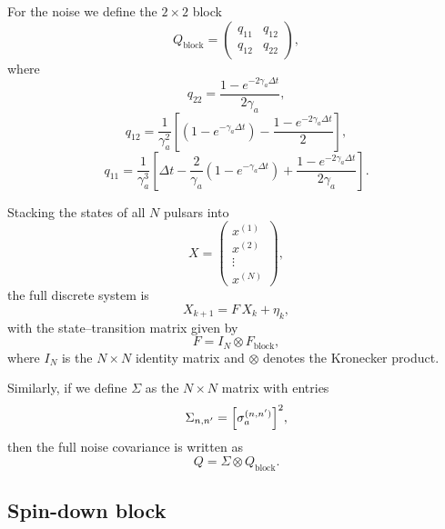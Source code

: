 \documentclass{tufte-handout} %
\begin{document}
For the noise we define the $2\times2$ block
\begin{equation}
Q_{\text{block}} = \begin{pmatrix}
q_{11} & q_{12}\\[1mm]
q_{12} & q_{22}
\end{pmatrix},
\end{equation}
where
\begin{equation}
q_{22} = \frac{1-e^{-2\gamma_a\Delta t}}{2\gamma_a},
\end{equation}
\begin{equation}
q_{12} = \frac{1}{\gamma_a^2}\left[\left(1-e^{-\gamma_a\Delta t}\right)-\frac{1-e^{-2\gamma_a\Delta t}}{2}\right],
\end{equation}
\begin{equation}
q_{11} = \frac{1}{\gamma_a^3}\left[\Delta t-\frac{2}{\gamma_a}\left(1-e^{-\gamma_a\Delta t}\right)+\frac{1-e^{-2\gamma_a\Delta t}}{2\gamma_a}\right].
\end{equation}

Stacking the states of all $N$ pulsars into
\begin{equation}
X = \begin{pmatrix} x^{(1)} \\[1mm] x^{(2)} \\[1mm] \vdots \\[1mm] x^{(N)} \end{pmatrix},
\end{equation}
the full discrete system is
\begin{equation}
X_{k+1} = F\,X_k + \eta_k,
\end{equation}
with the state--transition matrix given by
\begin{equation}
F = I_N \otimes F_{\text{block}},
\end{equation}
where $I_N$ is the $N\times N$ identity matrix and $\otimes$ denotes the Kronecker product.

Similarly, if we define $\Sigma$ as the $N\times N$ matrix with entries
\begin{equation}
\Sigma_{n,n'} = \Bigl[\sigma^{(n,n')}_a\Bigr]^2,
\end{equation}
then the full noise covariance is written as
\begin{equation}
Q = \Sigma \otimes Q_{\text{block}}.
\end{equation}





\subsection{Spin-down block}
\end{document}
